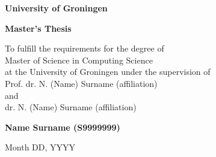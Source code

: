 \begin{center}

\vspace{3cm}%

\textbf{University of Groningen}

\vspace{1cm}%

{\Large\textbf{\theprojecttitle}\par} %

\vspace{2.5cm}%

\textbf{Master's Thesis}

\vspace{0.5cm}%

To fulfill the requirements for the degree of\\
Master of Science in Computing Science\\
at the University of Groningen under the supervision of\\
Prof. dr. N. (Name) Surname (affiliation)\\
and\\ %
dr. N. (Name) Surname (affiliation)\\

\vspace{3cm}%

\textbf{Name Surname (S9999999)}

\vspace{3cm}%

Month DD, YYYY

\end{center}

\clearpage
